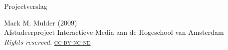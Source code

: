 \documentclass[12pt, a4paper]{article}
\begin{document}
  \thispagestyle{empty}

  \begin{flushleft}

    \Huge
    Projectverslag\\

    \vfill{}

    \small
    Mark M. Mulder (2009) \\
    Afstudeerproject Interactieve Media aan de Hogeschool van Amsterdam
    \\\emph{Rights reserved}.  \href{http://creativecommons.org/licenses/by-nc-nd/3.0/nl/}{\textsc{cc-by-nc-nd}}

  \end{flushleft}
  \pagebreak
  \normalsize
  
  \section{}
\end{document}
